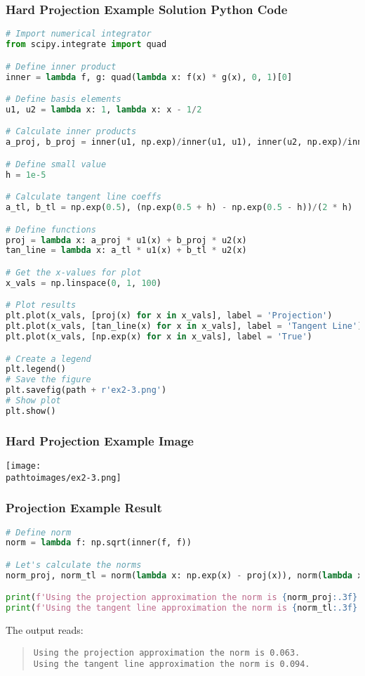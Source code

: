 \documentclass{beamer}
\newcommand{\pathtoimages}{/Users/charlesrambo/Desktop/Bootcamp24/Images}
\begin{document}
\begin{frame}[fragile]
\frametitle{Hard Projection Example Solution Python Code}
\begin{lstlisting}[language=Python]
# Import numerical integrator
from scipy.integrate import quad

# Define inner product
inner = lambda f, g: quad(lambda x: f(x) * g(x), 0, 1)[0]

# Define basis elements
u1, u2 = lambda x: 1, lambda x: x - 1/2 

# Calculate inner products
a_proj, b_proj = inner(u1, np.exp)/inner(u1, u1), inner(u2, np.exp)/inner(u2, u2) 

# Define small value
h = 1e-5

# Calculate tangent line coeffs
a_tl, b_tl = np.exp(0.5), (np.exp(0.5 + h) - np.exp(0.5 - h))/(2 * h)

# Define functions 
proj = lambda x: a_proj * u1(x) + b_proj * u2(x)
tan_line = lambda x: a_tl * u1(x) + b_tl * u2(x)

# Get the x-values for plot
x_vals = np.linspace(0, 1, 100)

# Plot results
plt.plot(x_vals, [proj(x) for x in x_vals], label = 'Projection')
plt.plot(x_vals, [tan_line(x) for x in x_vals], label = 'Tangent Line')
plt.plot(x_vals, [np.exp(x) for x in x_vals], label = 'True')

# Create a legend
plt.legend()
# Save the figure
plt.savefig(path + r'ex2-3.png')
# Show plot
plt.show()
\end{lstlisting}
\end{frame}

\begin{frame}[fragile]
\frametitle{Hard Projection Example Image}
\begin{center}
\texttt{[image: \\pathtoimages/ex2-3.png]}
\end{center}
\end{frame}

\begin{frame}[fragile]
\frametitle{Projection Example Result}

\begin{lstlisting}[language=Python]
# Define norm
norm = lambda f: np.sqrt(inner(f, f))

# Let's calculate the norms
norm_proj, norm_tl = norm(lambda x: np.exp(x) - proj(x)), norm(lambda x: np.exp(x) - tan_line(x))

print(f'Using the projection approximation the norm is {norm_proj:.3f}.')
print(f'Using the tangent line approximation the norm is {norm_tl:.3f}.')
\end{lstlisting}
The output reads:
\begin{quote}
{
\small
\texttt{Using the projection approximation the norm is 0.063.}\\
\texttt{Using the tangent line approximation the norm is 0.094.}
}
\end{quote}
\end{frame}
\end{document}
